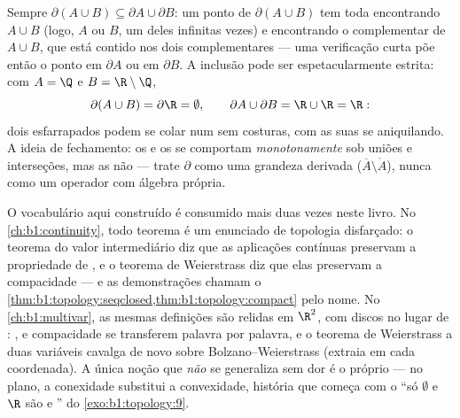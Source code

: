 \begin{example}\label{ex:b1:topology:boundaryunion}
Sempre $\partial(A \cup B) \subseteq \partial A \cup \partial
B$: um ponto de $\partial(A \cup B)$ tem toda 
encontrando $A \cup B$ (logo, $A$ ou $B$, um deles infinitas vezes)
e encontrando o complementar de $A \cup B$, que está contido nos
dois complementares --- uma verificação curta põe então o ponto em
$\partial A$ ou em $\partial B$. A inclusão pode ser espetacularmente
estrita: com $A = \Q$ e $B = \R\setminus\Q$,
\[
\partial(A \cup B) = \partial \R = \emptyset ,
\qquad
\partial A \cup \partial B = \R \cup \R = \R :
\]
dois  esfarrapados podem se colar num  sem costuras,
com as suas  se aniquilando. A ideia de fechamento: os
 e os  se comportam \emph{monotonamente} sob uniões e
interseções, mas as  não --- trate $\partial$ como uma
grandeza derivada ($\overline A \setminus \mathring A$), nunca como um
operador com álgebra própria.
\end{example}

\begin{remark}
O vocabulário aqui construído é consumido mais duas vezes neste livro.
No \cref{ch:b1:continuity}, todo teorema é um enunciado de topologia
disfarçado: o teorema do valor intermediário diz que as aplicações
contínuas preservam a propriedade de , e o teorema de
Weierstrass diz que elas preservam a compacidade --- e as demonstrações
chamam o \cref{thm:b1:topology:seqclosed,thm:b1:topology:compact} pelo nome. No
\cref{ch:b1:multivar}, as mesmas definições são relidas em $\R^2$, com
discos no lugar de : ,  e compacidade se
transferem palavra por palavra, e o teorema de Weierstrass a duas
variáveis cavalga de novo sobre Bolzano--Weierstrass (extraia em cada
coordenada). A única noção que \emph{não} se generaliza sem dor é o
próprio  --- no plano, a conexidade substitui a
convexidade, história que começa com o ``só $\emptyset$ e $\R$ são
 e '' do \cref{exo:b1:topology:9}.
\end{remark}

